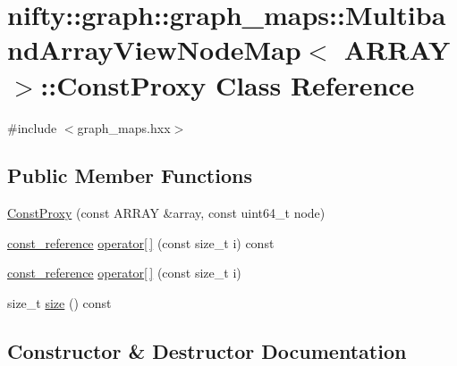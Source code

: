 \hypertarget{classnifty_1_1graph_1_1graph__maps_1_1MultibandArrayViewNodeMap_1_1ConstProxy}{}\section{nifty\+:\+:graph\+:\+:graph\+\_\+maps\+:\+:Multiband\+Array\+View\+Node\+Map$<$ A\+R\+R\+AY $>$\+:\+:Const\+Proxy Class Reference}
\label{classnifty_1_1graph_1_1graph__maps_1_1MultibandArrayViewNodeMap_1_1ConstProxy}


{\ttfamily \#include $<$graph\+\_\+maps.\+hxx$>$}

\subsection*{Public Member Functions}
\begin{DoxyCompactItemize}
\item 
\hyperlink{classnifty_1_1graph_1_1graph__maps_1_1MultibandArrayViewNodeMap_1_1ConstProxy_ace907294b73877c79b223ce1bd4b89a9}{Const\+Proxy} (const A\+R\+R\+AY \&array, const uint64\+\_\+t node)
\item 
\hyperlink{structnifty_1_1graph_1_1graph__maps_1_1MultibandArrayViewNodeMap_a9a4da5d4bb0e9439af359184b91bc65b}{const\+\_\+reference} \hyperlink{classnifty_1_1graph_1_1graph__maps_1_1MultibandArrayViewNodeMap_1_1ConstProxy_a989314ed949a94d5e6e2cd233253ae2d}{operator\mbox{[}$\,$\mbox{]}} (const size\+\_\+t i) const
\item 
\hyperlink{structnifty_1_1graph_1_1graph__maps_1_1MultibandArrayViewNodeMap_a9a4da5d4bb0e9439af359184b91bc65b}{const\+\_\+reference} \hyperlink{classnifty_1_1graph_1_1graph__maps_1_1MultibandArrayViewNodeMap_1_1ConstProxy_aaca8a39e292ca5e0e98fe8a49dc3d0fc}{operator\mbox{[}$\,$\mbox{]}} (const size\+\_\+t i)
\item 
size\+\_\+t \hyperlink{classnifty_1_1graph_1_1graph__maps_1_1MultibandArrayViewNodeMap_1_1ConstProxy_ad91f66c3c0b13b0528a6c99bb1663e5a}{size} () const
\end{DoxyCompactItemize}


\subsection{Constructor \& Destructor Documentation}
\mbox{\label{classnifty_1_1graph_1_1graph__maps_1_1MultibandArrayViewNodeMap_1_1ConstProxy_ace907294b73877c79b223ce1bd4b89a9}} 
